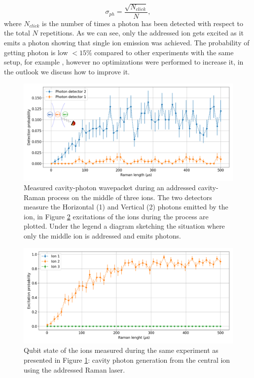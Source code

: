 \begin{equation}
\sigma_{ph} = \frac{\sqrt{N_{click}}}{N},
\end{equation}
where $N_{click}$ is the number of times a photon has been detected with respect to the total $N$ repetitions.
As we can see, only the addressed ion gets excited as it emits a photon showing that single ion emission was achieved. The probability of getting photon is low $<15 \%$ compared to other experiments with the same setup, for example \cite{Krutyanskiy2019}, however no optimizations were performed to increase it, in the outlook we discuss how to improve it.
\begin{figure}[H]
\centering
\includegraphics[width=\textwidth]{img/photonefficency_witherror2}
\caption{Measured cavity-photon wavepacket during an addressed cavity-Raman process on the middle of three ions. The two detectors measure the Horizontal (1) and Vertical (2) photons emitted by the ion, in Figure \ref{probion} excitations of the ions during the process are plotted. Under the legend a diagram sketching the situation where only the middle ion is addressed and emits photons.}
\label{probphoton}
\end{figure}
\begin{figure}[H]
\centering
\includegraphics[width=\textwidth]{img/ramanlength_witherrors}
\caption{Qubit state of the ions measured during the same experiment as presented in Figure \ref{probphoton}: cavity photon generation from the central ion using the addressed Raman laser.}
\label{probion}
\end{figure}

